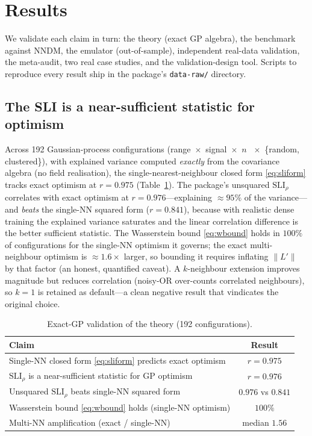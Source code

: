 \documentclass[11pt,a4paper]{article}
\newcommand{\SLI}{\mathrm{SLI}}
\newcommand{\SLIrho}{\SLI_{\rho}}
\begin{document}
\section{Results}\label{sec:results}

We validate each claim in turn: the theory (exact GP algebra), the benchmark against
NNDM, the emulator (out-of-sample), independent real-data validation, the
meta-audit, two real case studies, and the validation-design tool. Scripts to
reproduce every result ship in the package's \texttt{data-raw/} directory.

\subsection{The SLI is a near-sufficient statistic for optimism}\label{sec:res-theory}

Across 192 Gaussian-process configurations (range~$\times$~signal~$\times$~$n$
~$\times$~\{random, clustered\}), with explained variance computed \emph{exactly}
from the covariance algebra (no field realisation), the single-nearest-neighbour
closed form \eqref{eq:sliform} tracks exact optimism at $r=0.975$
(Table~\ref{tab:theory}). The package's unsquared $\SLIrho$ correlates with exact
optimism at $r=0.976$---explaining $\approx 95\%$ of the variance---and
\emph{beats} the single-NN squared form ($r=0.841$), because with realistic dense
training the explained variance saturates and the linear correlation difference is
the better sufficient statistic. The Wasserstein bound \eqref{eq:wbound} holds in
$100\%$ of configurations for the single-NN optimism it governs; the exact
multi-neighbour optimism is $\approx 1.6\times$ larger, so bounding it requires
inflating $\lVert L'\rVert$ by that factor (an honest, quantified caveat). A
$k$-neighbour extension improves magnitude but reduces correlation
(noisy-OR over-counts correlated neighbours), so $k=1$ is retained as default---a
clean negative result that vindicates the original choice.

\begin{table}[t]
\centering
\caption{Exact-GP validation of the theory (192 configurations).}
\label{tab:theory}
\small
\begin{tabular}{p{8.6cm} c}
\toprule
Claim & Result\\
\midrule
Single-NN closed form \eqref{eq:sliform} predicts exact optimism & $r=0.975$\\
$\SLIrho$ is a near-sufficient statistic for GP optimism & $r=0.976$\\
Unsquared $\SLIrho$ beats single-NN squared form & $0.976$ vs $0.841$\\
Wasserstein bound \eqref{eq:wbound} holds (single-NN optimism) & $100\%$\\
Multi-NN amplification (exact / single-NN) & median $1.56$\\
\bottomrule
\end{tabular}
\end{table}
\end{document}
